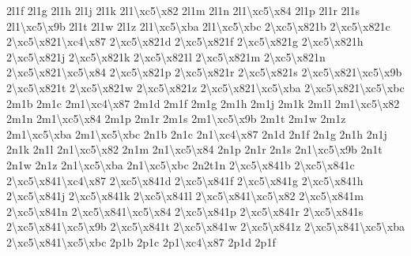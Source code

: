 \begin{DoxyCompactItemize}
2l1f 2l1g 2l1h 2l1j 2l1k 2l1\textbackslash{}xc5\textbackslash{}x82 2l1m 2l1n 2l1\textbackslash{}xc5\textbackslash{}x84 2l1p 2l1r 2l1s 2l1\textbackslash{}xc5\textbackslash{}x9b 2l1t 2l1w 2l1z 2l1\textbackslash{}xc5\textbackslash{}xba 2l1\textbackslash{}xc5\textbackslash{}xbc 2\textbackslash{}xc5\textbackslash{}x821b 2\textbackslash{}xc5\textbackslash{}x821c 2\textbackslash{}xc5\textbackslash{}x821\textbackslash{}xc4\textbackslash{}x87 2\textbackslash{}xc5\textbackslash{}x821d 2\textbackslash{}xc5\textbackslash{}x821f 2\textbackslash{}xc5\textbackslash{}x821g 2\textbackslash{}xc5\textbackslash{}x821h 2\textbackslash{}xc5\textbackslash{}x821j 2\textbackslash{}xc5\textbackslash{}x821k 2\textbackslash{}xc5\textbackslash{}x821l 2\textbackslash{}xc5\textbackslash{}x821m 2\textbackslash{}xc5\textbackslash{}x821n 2\textbackslash{}xc5\textbackslash{}x821\textbackslash{}xc5\textbackslash{}x84 2\textbackslash{}xc5\textbackslash{}x821p 2\textbackslash{}xc5\textbackslash{}x821r 2\textbackslash{}xc5\textbackslash{}x821s 2\textbackslash{}xc5\textbackslash{}x821\textbackslash{}xc5\textbackslash{}x9b 2\textbackslash{}xc5\textbackslash{}x821t 2\textbackslash{}xc5\textbackslash{}x821w 2\textbackslash{}xc5\textbackslash{}x821z 2\textbackslash{}xc5\textbackslash{}x821\textbackslash{}xc5\textbackslash{}xba 2\textbackslash{}xc5\textbackslash{}x821\textbackslash{}xc5\textbackslash{}xbc 2m1b 2m1c 2m1\textbackslash{}xc4\textbackslash{}x87 2m1d 2m1f 2m1g 2m1h 2m1j 2m1k 2m1l 2m1\textbackslash{}xc5\textbackslash{}x82 2m1n 2m1\textbackslash{}xc5\textbackslash{}x84 2m1p 2m1r 2m1s 2m1\textbackslash{}xc5\textbackslash{}x9b 2m1t 2m1w 2m1z 2m1\textbackslash{}xc5\textbackslash{}xba 2m1\textbackslash{}xc5\textbackslash{}xbc 2n1b 2n1c 2n1\textbackslash{}xc4\textbackslash{}x87 2n1d 2n1f 2n1g 2n1h 2n1j 2n1k 2n1l 2n1\textbackslash{}xc5\textbackslash{}x82 2n1m 2n1\textbackslash{}xc5\textbackslash{}x84 2n1p 2n1r 2n1s 2n1\textbackslash{}xc5\textbackslash{}x9b 2n1t 2n1w 2n1z 2n1\textbackslash{}xc5\textbackslash{}xba 2n1\textbackslash{}xc5\textbackslash{}xbc 2n2t1n 2\textbackslash{}xc5\textbackslash{}x841b 2\textbackslash{}xc5\textbackslash{}x841c 2\textbackslash{}xc5\textbackslash{}x841\textbackslash{}xc4\textbackslash{}x87 2\textbackslash{}xc5\textbackslash{}x841d 2\textbackslash{}xc5\textbackslash{}x841f 2\textbackslash{}xc5\textbackslash{}x841g 2\textbackslash{}xc5\textbackslash{}x841h 2\textbackslash{}xc5\textbackslash{}x841j 2\textbackslash{}xc5\textbackslash{}x841k 2\textbackslash{}xc5\textbackslash{}x841l 2\textbackslash{}xc5\textbackslash{}x841\textbackslash{}xc5\textbackslash{}x82 2\textbackslash{}xc5\textbackslash{}x841m 2\textbackslash{}xc5\textbackslash{}x841n 2\textbackslash{}xc5\textbackslash{}x841\textbackslash{}xc5\textbackslash{}x84 2\textbackslash{}xc5\textbackslash{}x841p 2\textbackslash{}xc5\textbackslash{}x841r 2\textbackslash{}xc5\textbackslash{}x841s 2\textbackslash{}xc5\textbackslash{}x841\textbackslash{}xc5\textbackslash{}x9b 2\textbackslash{}xc5\textbackslash{}x841t 2\textbackslash{}xc5\textbackslash{}x841w 2\textbackslash{}xc5\textbackslash{}x841z 2\textbackslash{}xc5\textbackslash{}x841\textbackslash{}xc5\textbackslash{}xba 2\textbackslash{}xc5\textbackslash{}x841\textbackslash{}xc5\textbackslash{}xbc 2p1b 2p1c 2p1\textbackslash{}xc4\textbackslash{}x87 2p1d 2p1f 
\end{DoxyCompactItemize}
